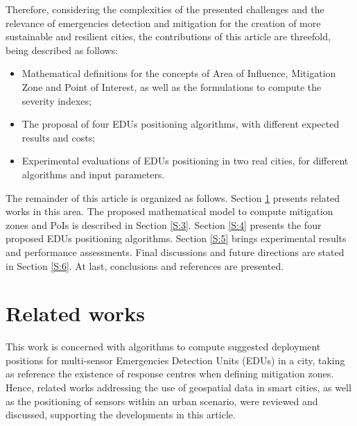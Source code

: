 \begin{refsection}
Therefore, considering the complexities of the presented challenges and the relevance of emergencies detection and mitigation for the creation of more sustainable and resilient cities, the contributions of this article are threefold, being described as follows:

\begin{itemize}
  \item Mathematical definitions for the concepts of Area of Influence, Mitigation Zone and Point of Interest, as well as the formulations to compute the severity indexes;
  \item The proposal of four EDUs positioning algorithms, with different expected results and costs;
  \item Experimental evaluations of EDUs positioning in two real cities, for different algorithms and input parameters.
\end{itemize}

The remainder of this article is organized as follows. Section \ref{S:2} presents related works in this area. The proposed mathematical model to compute mitigation zones and PoIs is described in Section \ref{S:3}. Section \ref{S:4} presents the four proposed EDUs positioning algorithms. Section \ref{S:5} brings experimental results and performance assessments. Final discussions and future directions are stated in Section \ref{S:6}. At last, conclusions and references are presented.

\section{Related works}\label{S:2}

This work is concerned with algorithms to compute suggested deployment positions for multi-sensor Emergencies Detection Units (EDUs) in a city, taking as reference the existence of response centres when defining mitigation zones. Hence, related works addressing the use of geospatial data in smart cities, as well as the positioning of sensors within an urban scenario, were reviewed and discussed, supporting the developments in this article.


\end{refsection}
